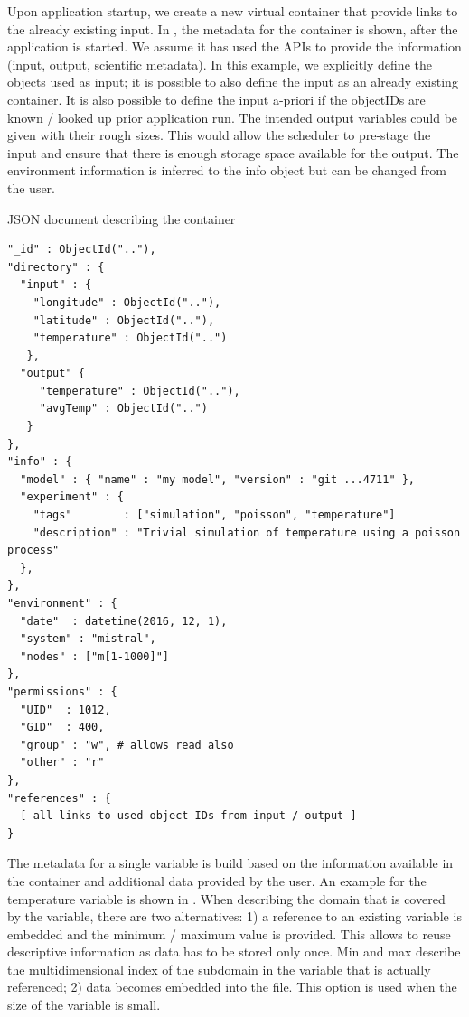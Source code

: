 \documentclass{../../template/esiwace-report}
\begin{document}
Upon application startup, we create a new virtual container that provide links to the already existing input.
In , the metadata for the container is shown, after the application is started.
We assume it has used the APIs to provide the information (input, output, scientific metadata).
In this example, we explicitly define the objects used as input; it is possible to also define
the input as an already existing container.
It is also possible to define the input a-priori if the objectIDs are known / looked up prior application run.
The intended output variables could be given with their rough sizes.
This would allow the scheduler to pre-stage the input and ensure that there is enough storage space available for the output.
The environment information is inferred to the info object but can be changed from the user.


\begin{tcbcode}[label={lst:mongoContainer}]{JSON document describing the container}
\begin{lstlisting}
"_id" : ObjectId(".."),
"directory" : {
  "input" : { 
    "longitude" : ObjectId(".."),
    "latitude" : ObjectId(".."), 
    "temperature" : ObjectId("..") 
   },
  "output" { 
     "temperature" : ObjectId(".."),
     "avgTemp" : ObjectId("..")
   }
},
"info" : {
  "model" : { "name" : "my model", "version" : "git ...4711" },
  "experiment" : { 
    "tags"        : ["simulation", "poisson", "temperature"]
    "description" : "Trivial simulation of temperature using a poisson process"
  },
},
"environment" : {  
  "date"  : datetime(2016, 12, 1), 
  "system" : "mistral", 
  "nodes" : ["m[1-1000]"] 
},
"permissions" : {
  "UID"  : 1012,
  "GID"  : 400,
  "group" : "w", # allows read also
  "other" : "r"
},
"references" : {
  [ all links to used object IDs from input / output ]
}
\end{lstlisting}
\end{tcbcode}

The metadata for a single variable is build based on the information available in the container and additional data provided by the user.
An example for the temperature variable is shown in .
When describing the domain that is covered by the variable, there are two alternatives:
1) a reference to an existing variable is embedded and the minimum / maximum value is provided.
This allows to reuse descriptive information as data has to be stored only once. Min and max describe the multidimensional index of the subdomain in the variable that is actually referenced;
2) data becomes embedded into the file. This option is used when the size of the variable is small.
\end{document}
